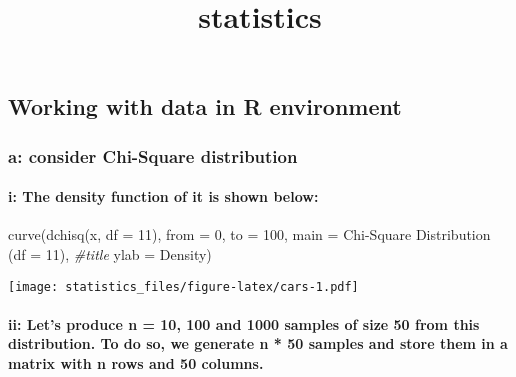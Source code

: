\documentclass[
]{article}
\title{statistics}
\author{}
\date{\vspace{-2.5em}}
\newenvironment{Shaded}{\begin{snugshade}}{\end{snugshade}}
\newcommand{\AttributeTok}[1]{\textcolor[rgb]{0.77,0.63,0.00}{#1}}
\newcommand{\CommentTok}[1]{\textcolor[rgb]{0.56,0.35,0.01}{\textit{#1}}}
\newcommand{\DecValTok}[1]{\textcolor[rgb]{0.00,0.00,0.81}{#1}}
\newcommand{\FunctionTok}[1]{\textcolor[rgb]{0.00,0.00,0.00}{#1}}
\newcommand{\NormalTok}[1]{#1}
\newcommand{\StringTok}[1]{\textcolor[rgb]{0.31,0.60,0.02}{#1}}
\begin{document}
\maketitle

\hypertarget{working-with-data-in-r-environment}{%
\subsection{Working with data in R
environment}\label{working-with-data-in-r-environment}}

\hypertarget{a-consider-chi-square-distribution}{%
\subsubsection{a: consider Chi-Square
distribution}\label{a-consider-chi-square-distribution}}

\hypertarget{i-the-density-function-of-it-is-shown-below}{%
\paragraph{i: The density function of it is shown
below:}\label{i-the-density-function-of-it-is-shown-below}}

\begin{Shaded}
\begin{Highlighting}[]
\FunctionTok{curve}\NormalTok{(}\FunctionTok{dchisq}\NormalTok{(x, }\AttributeTok{df =} \DecValTok{11}\NormalTok{), }\AttributeTok{from =} \DecValTok{0}\NormalTok{, }\AttributeTok{to =} \DecValTok{100}\NormalTok{,}
      \AttributeTok{main =} \StringTok{\textquotesingle{}Chi{-}Square Distribution (df = 11)\textquotesingle{}}\NormalTok{, }\CommentTok{\#title}
      \AttributeTok{ylab =} \StringTok{\textquotesingle{}Density\textquotesingle{}}\NormalTok{)}
\end{Highlighting}
\end{Shaded}

\texttt{[image: statistics\_files/figure-latex/cars-1.pdf]}

\hypertarget{ii-lets-produce-n-10-100-and-1000-samples-of-size-50-from-this-distribution.-to-do-so-we-generate-n-50-samples-and-store-them-in-a-matrix-with-n-rows-and-50-columns.}{%
\paragraph{ii: Let's produce n = 10, 100 and 1000 samples of size 50
from this distribution. To do so, we generate n * 50 samples and store
them in a matrix with n rows and 50
columns.}\label{ii-lets-produce-n-10-100-and-1000-samples-of-size-50-from-this-distribution.-to-do-so-we-generate-n-50-samples-and-store-them-in-a-matrix-with-n-rows-and-50-columns.}}
\end{document}
